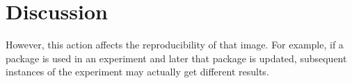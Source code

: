 \documentclass[a4paper,num-refs]{oup-contemporary}
\begin{document}






\section{Discussion}


However, this action affects the reproducibility
of that image. For example, if a package is used in an experiment
and later that package is updated, subsequent instances of the experiment may actually
get different results.

\end{document}
